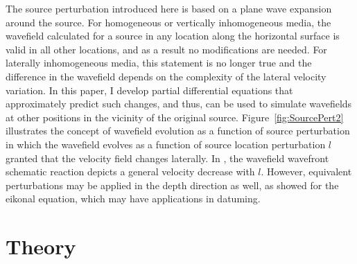 The source perturbation introduced here is based on a plane wave expansion around the source.
For homogeneous or vertically inhomogeneous media, the wavefield calculated for 
a source in any location along the horizontal surface is valid in all other locations, and as a result no modifications are needed. 
For laterally inhomogeneous media, this statement is no longer true and the 
difference in the wavefield 
depends on the complexity of the lateral velocity variation. In this paper, I develop partial differential equations that approximately predict such changes, and thus,
can be used to simulate wavefields  at other positions in the vicinity of the original source. Figure~\ref{fig:SourcePert2} illustrates the concept of wavefield evolution 
as a function of source perturbation in which the wavefield evolves as a function of source
location perturbation $l$ granted  that the velocity field changes laterally. In , the wavefield wavefront schematic reaction depicts 
a general velocity 
decrease with $l$.  However, equivalent perturbations may be applied in the depth direction as well,
as \cite{tariqds} showed for the eikonal equation, which may have applications in datuming.

\section{Theory}




